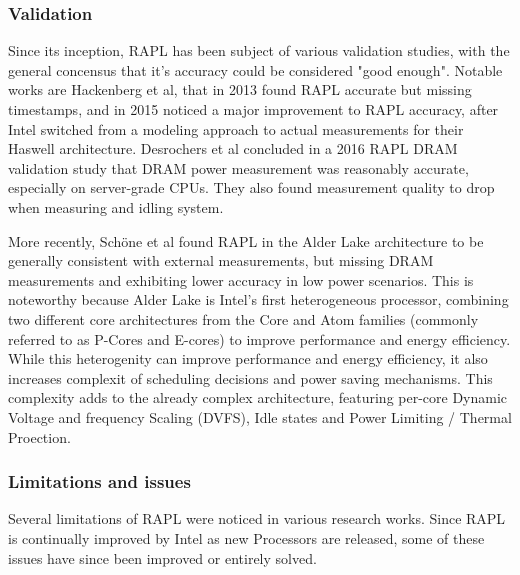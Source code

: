 \subsubsection{Validation}
\label{sec:raplvalidation}
Since its inception, RAPL has been subject of various validation studies, with the general concensus that it's accuracy could be considered "good enough"\parencite{raffin2024dissecting}. Notable works are Hackenberg et al, that in 2013 found RAPL accurate but missing timestamps\parencite{hackenberg2013power}, and in 2015 noticed a major improvement to RAPL accuracy, after Intel switched from a modeling approach to actual measurements for their Haswell architecture\parencite{hackenberg2015energy}. Desrochers et al concluded in a 2016 RAPL DRAM validation study\parencite{desrochers2016validation} that DRAM power measurement was reasonably accurate, especially on server-grade CPUs. They also found measurement quality to drop when measuring and idling system.

More recently, Schöne et al found RAPL in the Alder Lake architecture to be generally consistent with external measurements, but missing DRAM measurements and exhibiting lower accuracy in low power scenarios\parencite{schone2024energy}. This is noteworthy because Alder Lake is Intel's first heterogeneous processor, combining two different core architectures from the Core and Atom families (commonly referred to as P-Cores and E-cores) to improve performance and energy efficiency. While this heterogenity can improve performance and energy efficiency, it also increases complexit of scheduling decisions and power saving mechanisms. This complexity adds to the already complex architecture, featuring per-core Dynamic Voltage and frequency Scaling (DVFS), Idle states and Power Limiting / Thermal Proection.


\subsubsection{Limitations and issues}
\label{sec:rapllimitations}
Several limitations of RAPL were noticed in various research works. Since RAPL is continually improved by Intel as new Processors are released, some of these issues have since been improved or entirely solved. 

